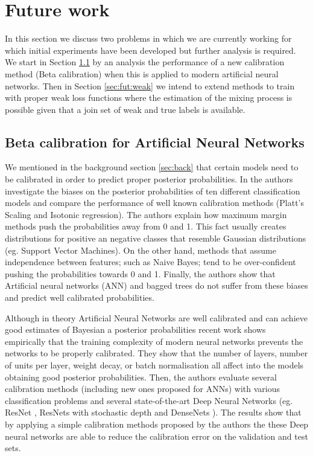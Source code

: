 \documentclass[a4paper, 12pt]{article}
\begin{document}
\section{Future work}
\label{sec:fut}

In this section we discuss two problems in which we are currently working for which initial experiments have been developed but further analysis is required.
We start in Section \ref{sec:fut:bc} by an analysis the performance of a new calibration method (Beta calibration) when this is applied to modern artificial neural networks.
Then in Section \ref{sec:fut:weak} we intend to extend methods to train with proper weak loss functions where the estimation of the mixing  process is possible given that a join set of weak and true labels is available.

\subsection{Beta calibration for Artificial Neural Networks}
\label{sec:fut:bc}

We mentioned in the background section \ref{sec:back} that certain models need to be calibrated in order to predict proper posterior probabilities.
In \cite{Niculescu-Mizil2005} the authors investigate the biases on the posterior probabilities of ten different classification models and compare the performance of well known calibration methods (Platt's Scaling and Isotonic regression).
The authors explain how maximum margin methods push the probabilities away from 0 and 1.
This fact usually creates distributions for positive an negative classes that resemble Gaussian distributions (eg. Support Vector Machines).
On the other hand, methods that assume independence between features; such as Naive Bayes; tend to be over-confident pushing the probabilities towards 0 and 1.
Finally, the authors show that Artificial neural networks (ANN) and bagged trees do not suffer from these biases and predict well calibrated probabilities.

Although in theory Artificial Neural Networks are well calibrated and can achieve good estimates of Bayesian a posterior probabilities \cite{Richard1991,Hung1996} recent work \cite{Guo2017} shows empirically that the training complexity of modern neural networks prevents the networks to be properly calibrated.
They show that the number of layers, number of units per layer, weight decay, or batch normalisation all affect into the models obtaining good posterior probabilities.
Then, the authors evaluate several calibration methods (including new ones proposed for ANNs) with various classification problems and several state-of-the-art Deep Neural Networks (eg. ResNet \cite{He2015},  ResNets with stochastic depth \cite{Huang2016} and DenseNets \cite{Huang2017}).
The results show that by applying a simple calibration methods proposed by the authors the these Deep neural networks are able to reduce the calibration error on the validation and test sets.
\end{document}
